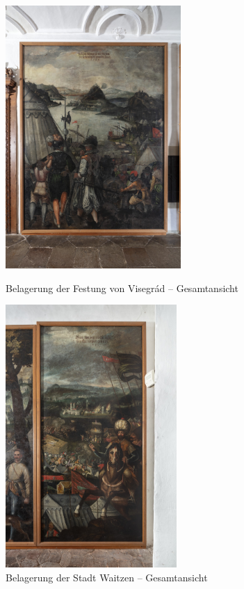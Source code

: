 \documentclass[
  a4paper,
]{book}
\begin{document}
\begin{figure}
\includegraphics[height=10cm]{images/fmd10005840a.jpg}

\caption{Belagerung der Festung von Visegrád – Gesamtansicht}
\label{fig:{images/fmd10005840a.jpg}}

\clearpage

\centering

\includegraphics[height=10cm]{images/fmd10005842a.jpg}

\caption{Belagerung der Stadt Waitzen – Gesamtansicht}
\label{fig:{images/fmd10005842a.jpg}}

\clearpage

\centering


\end{figure}
\end{document}

